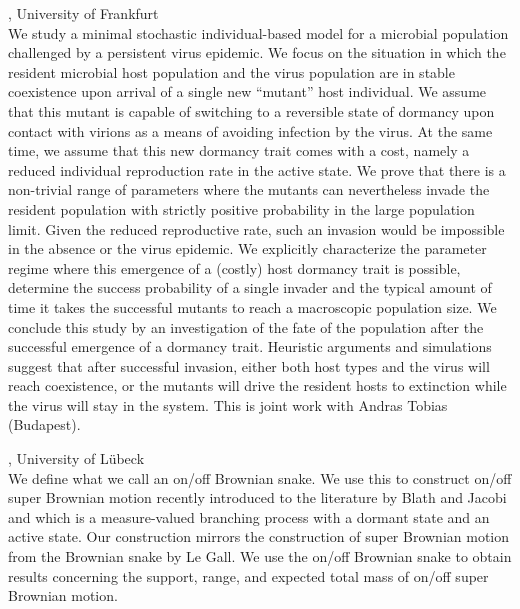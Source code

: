 \documentclass[12pt,a4paper]{article}
\begin{document}
, University of Frankfurt \\[2ex] We study a minimal stochastic individual-based model for a microbial population challenged by a persistent virus epidemic. We focus on the situation in which the resident microbial host population and the virus population are in stable coexistence upon arrival of a single new “mutant” host individual. We assume that this mutant is capable of switching to a reversible state of dormancy upon contact with virions as a means of avoiding infection by the virus. At the same time, we assume that this new dormancy trait comes with a cost, namely a reduced individual reproduction rate in the active state. We prove that there is a non-trivial range of parameters where the mutants can nevertheless invade the resident population with strictly positive probability in the large population limit.  Given the reduced reproductive rate, such an invasion would be impossible in the absence or the virus epidemic. We explicitly characterize the parameter regime where this emergence of a (costly) host dormancy trait is possible, determine the success probability of a single invader and the typical amount of time it takes the successful mutants to reach a macroscopic population size. We conclude this study by an investigation of the fate of the population after the successful emergence of a dormancy trait. Heuristic arguments and simulations suggest that after successful invasion, either both host types and the virus will reach coexistence, or the mutants will drive the resident hosts to extinction while the virus will stay in the system. This is joint work with Andras Tobias (Budapest). 

\bigskip\bigskip

, University of Lübeck \\[2ex] We define what we call an on/off Brownian snake. We use this to construct on/off super Brownian motion recently introduced to the literature by Blath and Jacobi and which is a measure-valued branching process with a dormant state and an active state. Our construction mirrors the construction of super Brownian motion from the Brownian snake by Le Gall. We use the on/off Brownian snake to obtain results concerning the support, range, and expected total mass of on/off super Brownian motion. 
\end{document}
